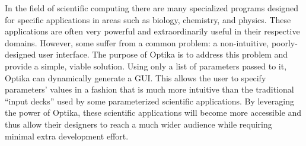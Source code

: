 In the field of scientific computing there are many specialized programs designed for specific applications 
in areas such as biology, chemistry, and physics. These applications are often very powerful and extraordinarily 
useful in their respective domains. However, some suffer from a common problem: a non-intuitive, poorly-designed user interface. 
The purpose of Optika is to address this problem and provide a simple, viable solution. Using
only a list of parameters passed to it, Optika can dynamically generate a GUI. This allows the user to specify 
parameters' values in a fashion that is much more intuitive than the traditional ``input decks'' used by some 
parameterized scientific applications. By leveraging the power of Optika, these scientific applications 
will become more accessible and thus allow their designers to reach a much wider audience while requiring 
minimal extra development effort.
